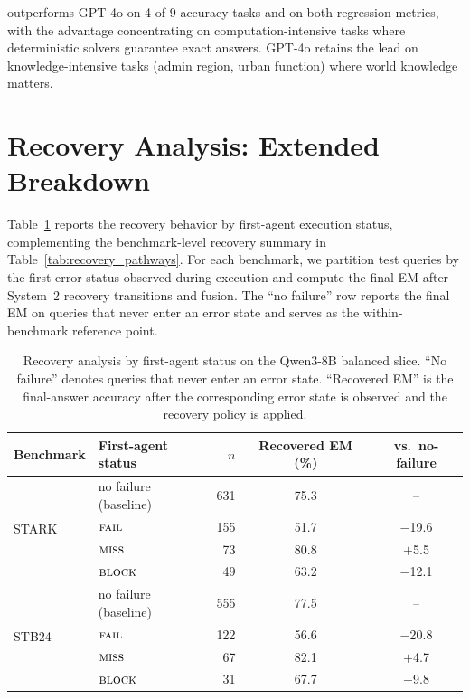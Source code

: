 \starname{} outperforms GPT-4o on 4 of 9 accuracy tasks and on both regression metrics, with the advantage concentrating on computation-intensive tasks where deterministic solvers guarantee exact answers.
GPT-4o retains the lead on knowledge-intensive tasks (admin region, urban function) where world knowledge matters.



\FloatBarrier
\section{Recovery Analysis: Extended Breakdown}
\label{app:recovery}

Table~\ref{tab:recovery_full} reports the recovery behavior by first-agent execution status, complementing the benchmark-level recovery summary in Table~\ref{tab:recovery_pathways}.
For each benchmark, we partition test queries by the first error status observed during execution and compute the final EM after System~2 recovery transitions and fusion.
The ``no failure'' row reports the final EM on queries that never enter an error state and serves as the within-benchmark reference point.

\begin{table}[!htbp]
\centering
\caption{Recovery analysis by first-agent status on the Qwen3-8B balanced slice. ``No failure'' denotes queries that never enter an error state. ``Recovered EM'' is the final-answer accuracy after the corresponding error state is observed and the recovery policy is applied.}
\label{tab:recovery_full}
\small
\begin{tabular}{l l r c c}
\toprule
Benchmark & First-agent status & $n$ & Recovered EM (\%) & vs.\ no-failure \\
\midrule
\multirow{4}{*}{STARK}
    & no failure (baseline) & 631 & 75.3 & -- \\
    & $\textnormal{\textsc{fail}}$              & 155  & 51.7 & $-$19.6 \\
    & $\textnormal{\textsc{miss}}$              & 73  & 80.8 & $+$5.5 \\
    & $\textnormal{\textsc{block}}$             & 49  & 63.2 & $-$12.1 \\
\midrule
\multirow{4}{*}{STB24}
    & no failure (baseline) & 555 & 77.5 & -- \\
    & $\textnormal{\textsc{fail}}$              & 122  & 56.6 & $-$20.8 \\
    & $\textnormal{\textsc{miss}}$              & 67  & 82.1 & $+$4.7 \\
    & $\textnormal{\textsc{block}}$             & 31  & 67.7 & $-$9.8 \\
\bottomrule
\end{tabular}
\end{table}

